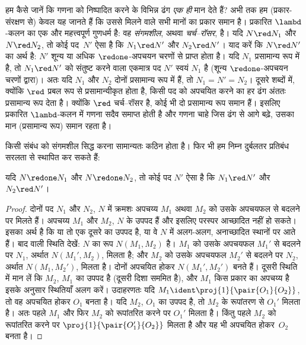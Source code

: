 \documentclass[../../../include/open-logic-section]{subfiles}
\begin{document}
हम कैसे जानें कि गणना को निष्पादित करने के विभिन्न ढंग \emph{एक ही} मान देते
हैं? अभी तक हम (प्रकार-संरक्षण से) केवल यह जानते हैं कि उससे मिलने वाले सभी
मानों का प्रकार समान है। प्रकारित $\lambd$-कलन का एक और महत्त्वपूर्ण गुणधर्म
है: वह \emph{संगमशील}, अथवा \emph{चर्च--रॉसर}, है। यदि $N \red N_1$ और
$N \red N_2$, तो कोई पद~$N'$ ऐसा है कि $N_1 \red N'$ और $N_2 \red N'$।
याद करें कि $N \red N'$ का अर्थ है: $N'$ शून्य या अधिक $\redone$-अपचयन
चरणों से प्राप्त होता है। यदि $N_1$ प्रसामान्य रूप में है, तो $N_1 \red N'$
को संतुष्ट करने वाला एकमात्र पद $N'$ स्वयं $N_1$ है (शून्य $\redone$-अपचयन
चरणों द्वारा)। अतः यदि $N_1$ और $N_2$ दोनों प्रसामान्य रूप में हैं, तो
$N_1 = N' = N_2$। दूसरे शब्दों में, क्योंकि $\red$ प्रबल रूप से
प्रसामान्यीकृत होता है, किसी पद को अपचयित करने का हर ढंग अंततः प्रसामान्य
रूप देता है। क्योंकि $\red$ चर्च--रॉसर है, कोई भी दो प्रसामान्य रूप समान
हैं। इसलिए प्रकारित $\lambd$-कलन में गणना सदैव समाप्त होती है और गणना चाहे
जिस ढंग से आगे बढ़े, उसका मान (प्रसामान्य रूप) समान रहता है।

किसी संबंध को संगमशील सिद्ध करना सामान्यतः कठिन होता है। फिर भी हम निम्न
दुर्बलतर प्रतिबंध सरलता से स्थापित कर सकते हैं:

\begin{prop}[दुर्बल चर्च--रॉसर गुणधर्म]
यदि $N \redone N_1$ और $N \redone N_2$, तो कोई पद $N'$ ऐसा है कि
$N_1 \red N'$ और $N_2 \red N'$।
\end{prop}

\begin{proof}
  दोनों पद $N_1$ और $N_2$, $N$ में क्रमशः अपचय्य $M_1$ अथवा $M_2$ को उसके
  अपचयफल से बदलने पर मिलते हैं। अपचय्य $M_1$ और $M_2$, $N$ के उपपद हैं और
  इसलिए परस्पर आच्छादित नहीं हो सकते। इसका अर्थ है कि या तो एक दूसरे का
  उपपद है, या वे $N$ में अलग-अलग, अनाच्छादित स्थानों पर आते हैं। बाद वाली
  स्थिति देखें: $N$ का रूप $N(M_1,M_2)$ है। $M_1$ को उसके अपचयफल $M_1'$ से
  बदलने पर $N_1$, अर्थात $N(M_1',M_2)$, मिलता है; और $M_2$ को उसके अपचयफल
  $M_2'$ से बदलने पर $N_2$, अर्थात $N(M_1,M_2')$, मिलता है। दोनों अपचयित
  होकर $N(M_1',M_2')$ बनते हैं। दूसरी स्थिति में मान लें कि $M_2$, $M_1$ का
  उपपद है (दूसरी दिशा सममित है), और $M_1$ किस प्रकार का अपचय्य है इसके
  अनुसार स्थितियाँ अलग करें। उदाहरणतः यदि $M_1 \ident
  \proj{1}{\pair{O_1}{O_2}}$, तो वह अपचयित होकर $O_1$ बनता है। यदि $M_2$,
  $O_1$ का उपपद है, तो $M_2$ के रूपांतरण से $O_1'$ मिलता है। अतः पहले $M_1$
  और फिर $M_2$ को रूपांतरित करने पर $O_1'$ मिलता है। किंतु पहले $M_2$ को
  रूपांतरित करने पर $\proj{1}{\pair{O_1'}{O_2}}$ मिलता है और यह भी अपचयित
  होकर~$O_2$ बनता है।
\end{proof}
\end{document}
